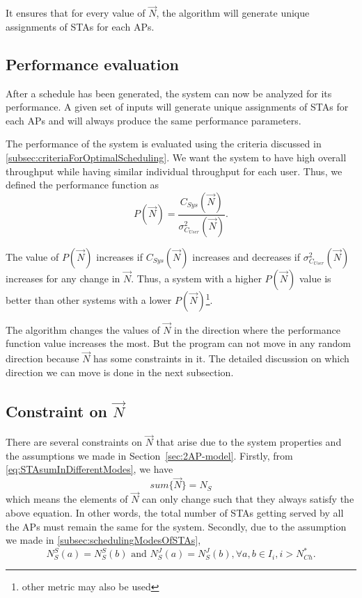 It ensures that for every value of $\vec{N}$, the algorithm will generate unique assignments of STAs for each APs.



\subsection{Performance evaluation}
After a schedule has been generated, the system can now be analyzed for its performance. A given set of inputs will generate unique assignments of STAs for each APs and will always produce the same performance parameters.

The performance of the system is evaluated using the criteria discussed in \ref{subsec:criteriaForOptimalScheduling}.
We want the system to have high overall throughput while having similar individual throughput for each user. Thus, we defined the performance function as
\begin{equation}
    P(\vec{N}) = \frac{C_{Sys}(\vec{N})}{\sigma_{C_{User}}^2(\vec{N})}.
\end{equation}

The value of $P(\vec{N})$ increases if $C_{Sys}(\vec{N})$ increases and decreases if $\sigma_{C_{User}}^2(\vec{N})$ increases for any change in $\vec{N}$.
Thus, a system with a higher $P(\vec{N})$ value is better than other systems with a lower $P(\vec{N})$\footnote{other metric may also be used}.

The algorithm changes the values of $\vec{N}$ in the direction where the performance function value increases the most. But the program can not move in any random direction because $\vec{N}$ has some constraints in it. The detailed discussion on which direction we can move is done in the next subsection.



\subsection{Constraint on $\Vec{N}$}
There are several constraints on $\Vec{N}$ that arise due to the system properties and the assumptions we made in Section~\ref{sec:2AP-model}.
Firstly, from \eqref{eq:STAsumInDifferentModes}, we have
\begin{equation}
    sum \{\vec{N}\} = N_S
\end{equation}
which means the elements of $\vec{N}$ can only change such that they always satisfy the above equation.
In other words, the total number of STAs getting served by all the APs must remain the same for the system.
Secondly, due to the assumption we made in \ref{subsec:schedulingModesOfSTAs},
\begin{equation}
    N_S^S(a) = N_S^S(b) \text{ and } N_S^J(a) = N_S^J(b), \forall a, b \in I_i, i > N_{Ch}^*.
\end{equation}



